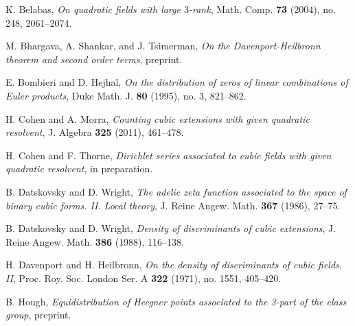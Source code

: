 \documentclass[12pt]{amsart}
\theoremstyle{remark}
\numberwithin{theorem}{section} \numberwithin{equation}{section}
\begin{document}
\begin{thebibliography}{99}

 K. Belabas,
\emph{On quadratic fields with large $3$-rank},
Math. Comp. \textbf{73} (2004), no. 248, 2061--2074.


 M. Bhargava, A. Shankar, and J. Tsimerman,
\emph{On the Davenport-Heilbronn theorem and second order terms}, preprint.

 E. Bombieri and D. Hejhal,
\emph{On the distribution of zeros of linear combinations of Euler products}, 
Duke Math. J.  \textbf{80} (1995),  no. 3, 821--862.


 H. Cohen and A. Morra,
\emph{Counting cubic extensions with given quadratic resolvent}, J. Algebra \textbf{325} (2011), 461--478. 

 H. Cohen and F. Thorne, \emph{Dirichlet series associated to cubic fields with given quadratic resolvent},
in preparation.

 B. Datskovsky and D. Wright,
\emph{The adelic zeta function associated to the space of binary cubic forms. II. Local theory},
J. Reine Angew. Math. \textbf{367}  (1986), 27--75.

 B. Datskovsky and D. Wright,
\emph{Density of discriminants of cubic extensions},
J. Reine Angew. Math. \textbf{386}  (1988), 116--138. 

 H. Davenport and H. Heilbronn,
\emph{On the density of discriminants of cubic fields. II}, 
Proc. Roy. Soc. London Ser. A \textbf{322}  (1971), no. 1551, 405--420. 




 B. Hough,
\emph{Equidistribution of Heegner points associated to the 3-part of the class group}, preprint.


\end{thebibliography}
\end{document}
